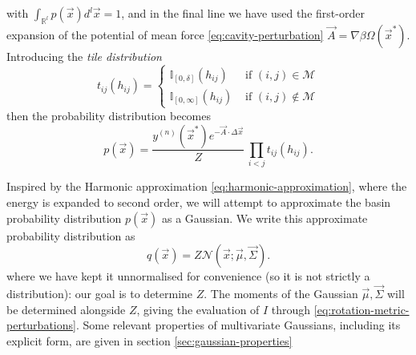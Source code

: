 \documentclass[11pt,twoside]{report}
\begin{document}
with $\int_{\mathbb{R}^l} p(\vec{x}) d^l\vec{x} = 1$, and in the final line we have used the first-order expansion of the potential of mean force \eqref{eq:cavity-perturbation} $\vec{A} = \nabla \beta\Omega(\vec{x}^*)$.
Introducing the \emph{tile distribution}
\begin{equation}\label{eq:ep-tile-distribution}
  t_{ij}(h_{ij})
  =
  \begin{cases}
    \mathbb{I}_{[0, \delta]}(h_{ij}) & \textrm{ if } (i,j) \in \mathcal{M} \\
    \mathbb{I}_{[0, \infty]}(h_{ij}) & \textrm{ if } (i,j) \notin \mathcal{M}
  \end{cases}
\end{equation}
then the probability distribution becomes
\begin{equation}\label{eq:ep-p-tiles}
  p(\vec{x})
  =
  \frac{y^{(n)}(\vec{x}^*) e^{-\vec{A} \cdot \Delta \vec{x}}}{Z}
  \,
  \prod_{i < j} t_{ij}(h_{ij}).
\end{equation}

Inspired by the Harmonic approximation \eqref{eq:harmonic-approximation}, where the energy is expanded to second order, we will attempt to approximate the basin probability distribution $p(\vec{x})$ as a Gaussian.
We write this approximate probability distribution as
\begin{equation}
  q(\vec{x}) = Z \mathcal{N}(\vec{x}; \vec{\mu}, \vec{\Sigma}).
\end{equation}
where we have kept it unnormalised for convenience (so it is not strictly a distribution): our goal is to determine $Z$.
The moments of the Gaussian $\vec{\mu}, \vec{\Sigma}$ will be determined alongside $Z$, giving the evaluation of $I$ through \eqref{eq:rotation-metric-perturbations}.
Some relevant properties of multivariate Gaussians, including its explicit form, are given in section \ref{sec:gaussian-properties}
\end{document}
